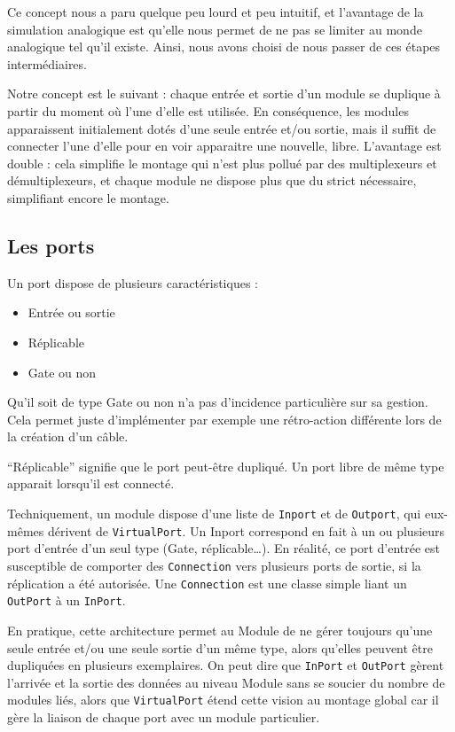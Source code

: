 Ce concept nous a paru quelque peu lourd et peu intuitif, et
l'avantage de la simulation analogique est qu'elle nous permet de
ne pas se limiter au monde analogique tel qu'il existe. Ainsi, nous
avons choisi de nous passer de ces étapes intermédiaires.

Notre concept est le suivant : chaque entrée et sortie d'un module
se duplique à partir du moment où l'une d'elle est utilisée. En
conséquence, les modules apparaissent initialement dotés d'une
seule entrée et/ou sortie, mais il suffit de connecter l'une d'elle
pour en voir apparaitre une nouvelle, libre. L'avantage est double
: cela simplifie le montage qui n'est plus pollué par des
multiplexeurs et démultiplexeurs, et chaque module ne dispose plus
que du strict nécessaire, simplifiant encore le montage.

\subsection{Les ports}

Un port dispose de plusieurs caractéristiques :

\begin{itemize}
\item
  Entrée ou sortie
\item
  Réplicable
\item
  Gate ou non
\end{itemize}
Qu'il soit de type Gate ou non n'a pas d'incidence particulière sur
sa gestion. Cela permet juste d'implémenter par exemple une
rétro-action différente lors de la création d'un câble.

``Réplicable'' signifie que le port peut-être dupliqué. Un port
libre de même type apparait lorsqu'il est connecté.

Techniquement, un module dispose d'une liste de \verb!Inport! et de
\verb!Outport!, qui eux-mêmes dérivent de \verb!VirtualPort!. Un
Inport correspond en fait à un ou plusieurs port d'entrée d'un seul
type (Gate, réplicable\ldots{}). En réalité, ce port d'entrée est
susceptible de comporter des \verb!Connection! vers plusieurs ports
de sortie, si la réplication a été autorisée. Une \verb!Connection!
est une classe simple liant un \verb!OutPort! à un \verb!InPort!.

En pratique, cette architecture permet au Module de ne gérer
toujours qu'une seule entrée et/ou une seule sortie d'un même type,
alors qu'elles peuvent être dupliquées en plusieurs exemplaires. On
peut dire que \verb!InPort! et \verb!OutPort! gèrent l'arrivée et
la sortie des données au niveau Module sans se soucier du nombre de
modules liés, alors que \verb!VirtualPort! étend cette vision au
montage global car il gère la liaison de chaque port avec un module
particulier.

